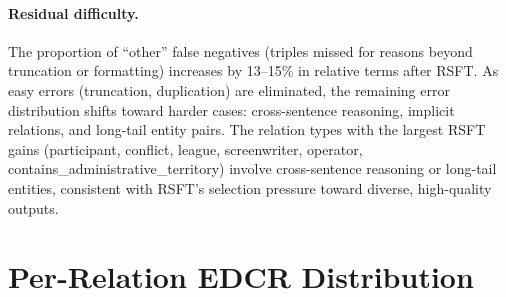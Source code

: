 \paragraph{Residual difficulty.} The proportion of ``other'' false negatives (triples missed for reasons beyond truncation or formatting) increases by 13--15\% in relative terms after RSFT. As easy errors (truncation, duplication) are eliminated, the remaining error distribution shifts toward harder cases: cross-sentence reasoning, implicit relations, and long-tail entity pairs. The relation types with the largest RSFT gains (participant, conflict, league, screenwriter, operator, contains\_administrative\_territory) involve cross-sentence reasoning or long-tail entities, consistent with RSFT's selection pressure toward diverse, high-quality outputs.

\begin{table}[t]
\centering
\caption{Error pattern changes from SFT to RSFT across scales. $\Delta$\% shows relative change. Truncation FN, hallucinated FP, and duplicates all decrease; evidence quality and residual FN difficulty are unchanged.}
\label{tab:error_analysis}
\small
{}
\end{table}


\section{Per-Relation EDCR Distribution}
\label{sec:edcr_per_relation}

